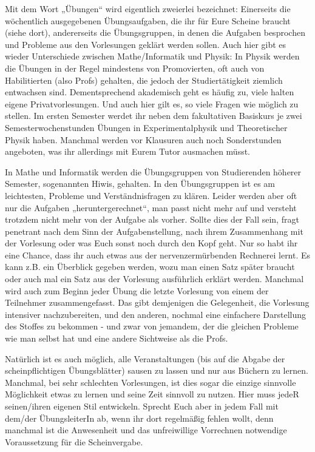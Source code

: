 Mit dem Wort „Übungen“ wird eigentlich zweierlei bezeichnet: Einerseits die wöchentlich ausgegebenen Übungsaufgaben, die ihr für Eure Scheine braucht (siehe dort), andererseits die Übungsgruppen, in denen die Aufgaben besprochen und Probleme aus den Vorlesungen geklärt werden sollen. Auch hier gibt es wieder Unterschiede zwischen Mathe/Informatik und Physik: In Physik werden die Übungen in der Regel mindestens von Promovierten, oft auch von Habilitierten (also Profs) gehalten, die jedoch der Studiertätigkeit ziemlich entwachsen sind. Dementsprechend akademisch geht es häufig zu, viele halten eigene Privatvorlesungen. Und auch hier gilt es, so viele Fragen wie möglich zu stellen. Im ersten Semester werdet ihr neben dem fakultativen Basiskurs je zwei Semesterwochenstunden Übungen in Experimentalphysik und Theoretischer Physik haben. Manchmal werden vor Klausuren auch noch Sonderstunden angeboten, was ihr allerdings mit Eurem Tutor ausmachen müsst.

In Mathe und Informatik werden die Übungsgruppen von Studierenden höherer Semester, sogenannten Hiwis, gehalten. In den Übungsgruppen ist es am leichtesten, Probleme und Verständnisfragen zu klären. Leider werden aber oft nur die Aufgaben „heruntergerechnet“, man passt nicht mehr auf und versteht trotzdem nicht mehr von der Aufgabe als vorher. Sollte dies der Fall sein, fragt penetrant nach dem Sinn der Aufgabenstellung, nach ihrem Zusammenhang mit der Vorlesung oder was Euch sonst noch durch den Kopf geht. Nur so habt ihr eine Chance, dass ihr auch etwas aus der nervenzermürbenden Rechnerei lernt. Es kann z.B. ein Überblick gegeben werden, wozu man einen Satz später braucht oder auch mal ein Satz aus der Vorlesung ausführlich erklärt werden. Manchmal wird auch zum Beginn jeder Übung die letzte Vorlesung von einem der Teilnehmer zusammengefasst. Das gibt demjenigen die Gelegenheit, die Vorlesung intensiver nachzubereiten, und den anderen, nochmal eine einfachere Darstellung des Stoffes zu bekommen - und zwar von jemandem, der die gleichen Probleme wie man selbst hat und eine andere Sichtweise als die Profs.

Natürlich ist es auch möglich, alle Veranstaltungen (bis auf die Abgabe der scheinpflichtigen Übungsblätter) sausen zu lassen und nur aus Büchern zu lernen. Manchmal, bei sehr schlechten Vorlesungen, ist dies sogar die einzige sinnvolle Möglichkeit etwas zu lernen und seine Zeit sinnvoll zu nutzen. Hier muss jedeR seinen/ihren eigenen Stil entwickeln. Sprecht Euch aber in jedem Fall mit dem/der ÜbungsleiterIn ab, wenn ihr dort regelmäßig fehlen wollt, denn manchmal ist die Anwesenheit und das unfreiwillige Vorrechnen notwendige Voraussetzung für die Scheinvergabe.
